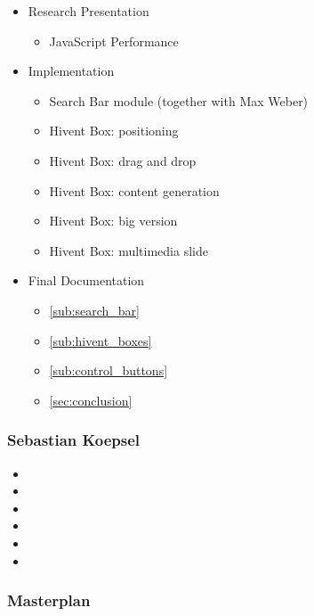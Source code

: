 \begin{itemize}
  \item Research Presentation
  \begin{itemize}
    \item JavaScript Performance
  \end{itemize}
  \item Implementation
  \begin{itemize}
    \item Search Bar module (together with Max Weber)
    \item Hivent Box: positioning
    \item Hivent Box: drag and drop
    \item Hivent Box: content generation
    \item Hivent Box: big version
    \item Hivent Box: multimedia slide
  \end{itemize}
  \item Final Documentation
  \begin{itemize}
    \item \ref{sub:search_bar} 
    \item \ref{sub:hivent_boxes} 
    \item \ref{sub:control_buttons} 
    \item \ref{sec:conclusion} 
  \end{itemize}
\end{itemize}


\subsubsection{Sebastian Koepsel} %
\label{ssub:sebastian_koepsel}

\begin{itemize}
  \item
  \item
  \item
  \item
  \item
  \item
\end{itemize}


\subsubsection{Masterplan} %
\label{ssub:masterplan}

